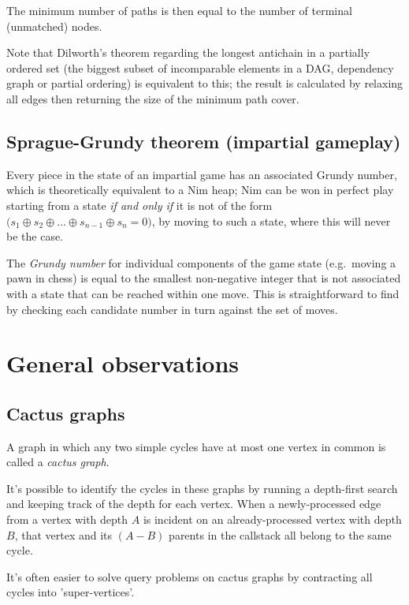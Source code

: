     The minimum number of paths is then equal to the number of terminal (unmatched) nodes.

    Note that Dilworth's theorem regarding the longest antichain in a partially ordered set (the biggest subset of incomparable elements in a DAG, dependency graph
    or partial ordering) is equivalent to this; the result is calculated by relaxing all edges then returning the size of the minimum path cover.

  \subsection {Sprague-Grundy theorem (impartial gameplay)}
    Every piece in the state of an impartial game has an associated Grundy number, which is theoretically equivalent to a Nim heap; Nim can be won in perfect play
    starting from a state \emph{if and only if} it is not of the form $ \big( s_{1} \oplus s_{2} \oplus \ldots \oplus s_{n-1} \oplus s_{n} = 0 \big) $, by moving to such
    a state, where this will never be the case.

    The \emph{Grundy number} for individual components of the game state (e.g.\ moving a pawn in chess) is equal to the smallest non-negative integer that is not
    associated with a state that can be reached within one move. This is straightforward to find by checking each candidate number in turn against the set of moves.

\section {General observations}

  \subsection {Cactus graphs}
    A graph in which any two simple cycles have at most one vertex in common is called a \emph{cactus graph}.

    It's possible to identify the cycles in these graphs by running a depth-first search and keeping track of the depth for each vertex. When a newly-processed edge
    from a vertex with depth $A$ is incident on an already-processed vertex with depth $B$, that vertex and its $ (A - B) $ parents in the callstack all belong to the
    same cycle.

    It's often easier to solve query problems on cactus graphs by contracting all cycles into 'super-vertices'.

